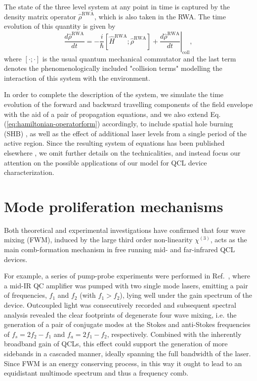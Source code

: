 \documentclass[journal]{IEEEtran}
\def\h{\hat}
\begin{document}
The state of the three level system at any point in time is captured by the density matrix operator $\h{\rho}^{\text{RWA}}$, which is also taken in the RWA. The time evolution of this quantity is given by
	\begin{equation}
	\label{eq:vonNeumann}
	\frac{d \h{\rho}^{\text{RWA}}}{dt} = -\frac{i}{\hbar}[\h{H}^{\text{RWA}};\h{\rho}^{\text{RWA}}] + \left.\frac{d\h{\rho}^{\text{RWA}}}{dt}\right|_{\text{coll}},
	\end{equation}
	where $[\cdot;\cdot]$ is the usual quantum mechanical commutator and the last term denotes the phenomenologically included "collision terms" modelling the interaction of this system with the environment.

	In order to complete the description of the system, we simulate the time evolution of the forward and backward travelling components of the field envelope with the aid of a pair of propagation equations, and we also extend Eq. (\ref{eq:hamiltonian-operatorform}) accordingly,  to include  spatial hole burning (SHB) \cite{gordon2008multimode}, as well as the effect of additional laser levels from a single period of the active region. Since the resulting system of equations has been published elsewhere \cite{petz2016}, we omit further details on the technicalities, and instead focus our attention on the possible applications of our model for QCL device characterization. 
	
	\section{Mode proliferation mechanisms}
	\label{sec:proliferation}
	
	Both theoretical \cite{khurgin2014coherent} and experimental \cite{friedli2013four} investigations have confirmed that four wave mixing (FWM), induced by the large third order non-linearity $\chi^{(3)}$, acts as the main comb-formation mechanism in free running mid- and far-infrared QCL devices.
	
	For example, a series of pump-probe experiments were performed in Ref.~\cite{friedli2013four}, where a mid-IR QC amplifier was pumped with two single mode lasers, emitting a pair of frequencies, $f_1$ and $f_2$ (with $f_1 > f_2$), lying well under the gain spectrum of the device. Outcoupled light was consecutively recorded and subsequent spectral analysis revealed the clear footprints of degenerate four wave mixing, i.e. the generation of a pair of conjugate modes at the Stokes and anti-Stokes frequencies of  $f_s = 2f_2 -f_1 $ and $f_a = 2f_1 - f_2 $, respectively. Combined with the inherently broadband gain of QCLs, this effect could support the generation of more sidebands in a cascaded manner, ideally spanning the full bandwidth of the laser. Since FWM is an energy conserving process, in this way it ought to lead to an equidistant multimode spectrum and thus a frequency comb.
	
\end{document}
